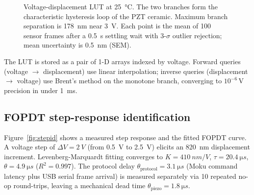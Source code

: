 \documentclass[fleqn,10pt]{wlscirep}
\begin{document}
\begin{figure}[ht]
    \centering
    \caption{Voltage-displacement LUT at \SI{25}{\celsius}. The two branches form the characteristic hysteresis loop of the PZT ceramic. Maximum branch separation is \SI{178}{nm} near \SI{3}{V}. Each point is the mean of 100 sensor frames after a \SI{0.5}{s} settling wait with 3-$\sigma$ outlier rejection; mean uncertainty is \SI{0.5}{nm} (SEM).}
    \label{fig:lut}
\end{figure}

The LUT is stored as a pair of 1-D arrays indexed by voltage. Forward queries (voltage $\to$ displacement) use linear interpolation; inverse queries (displacement $\to$ voltage) use Brent's method on the monotone branch, converging to $10^{-6}$\,V precision in under \SI{1}{ms}.

\subsection*{FOPDT step-response identification}

Figure~\ref{fig:stepid} shows a measured step response and the fitted FOPDT curve. A voltage step of $\Delta V = \SI{2}{V}$ (from \SI{0.5}{V} to \SI{2.5}{V}) elicits an \SI{820}{nm} displacement increment. Levenberg-Marquardt fitting converges to $K = \SI{410}{nm/V}$, $\tau = \SI{20.4}{\micro s}$, $\theta = \SI{4.9}{\micro s}$ ($R^2 = 0.997$). The protocol delay $\theta_{\text{protocol}} = \SI{3.1}{\micro s}$ (Moku command latency plus USB serial frame arrival) is measured separately via 10 repeated no-op round-trips, leaving a mechanical dead time $\theta_{\text{piezo}} = \SI{1.8}{\micro s}$.
\end{document}
